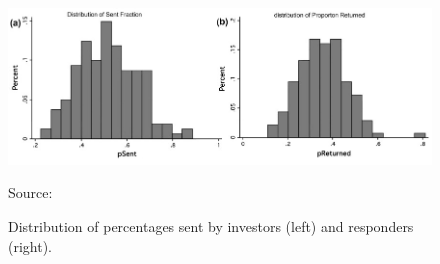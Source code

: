 \documentclass[12pt]{article}
\begin{document}
\begin{figure}[H]
    \centering
    \caption{Distribution of percentages sent by investors (left) and responders (right).}
    \includegraphics[width=1.\textwidth]{figure_trust1.png}
   
    Source: \cite{Johnson2011}
    \label{fig:turst1}
\end{figure}
\end{document}
